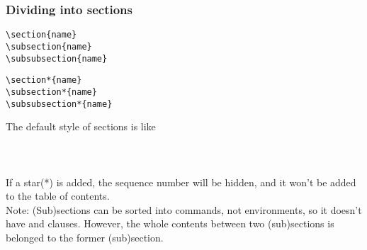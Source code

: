 \begin{frame}[fragile]
	\frametitle{Dividing into sections}
	\begin{command}
		\begin{multicols}{2}
			\begin{verbatim}
\section{name}
\subsection{name}
\subsubsection{name}
			\end{verbatim}
			\begin{verbatim}
\section*{name}
\subsection*{name}
\subsubsection*{name}
			\end{verbatim}
		\end{multicols}
		\vspace{-0.5em}
	\end{command}
	The default style of sections is like\\
	\\
	\\
	\\[0.5em]
	If a star(\alert{*}) is added, the sequence number will be hidden, and it won't be added to the table of contents.\\
	\alert{Note:} (Sub)sections can be sorted into commands, not environments, so it doesn't have \LC{\begin} and \LC{\end} clauses. However, the whole contents between two (sub)sections is belonged to the former (sub)section.
\end{frame}

